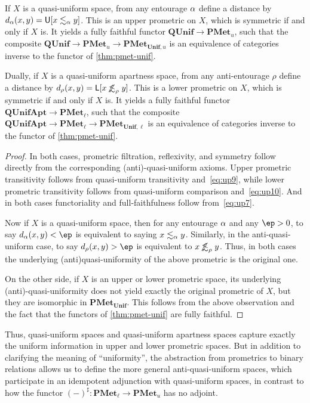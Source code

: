 \documentclass{article}
\def\upp#1{{#1}^{\sharp}}
\def\U[#1]{\mathsf{U}[#1]}
\def\L[#1]{\mathsf{L}[#1]}
\def\oapt{\mathrel{\!\not\,\not\lesssim}}
\def\leapx{\lesssim}
\def\ent#1{\leapx_{#1}}
\def\aent#1{\oapt_{#1}}
\def\PMetUnif{\mathbf{PMet}_{\mathbf{Unif}}}
\def\PMetu{\mathbf{PMet}_u}
\def\PMetl{\mathbf{PMet}_\ell}
\def\PMetUnifu{\mathbf{PMet}_{\mathbf{Unif},u}}
\def\PMetUnifl{\mathbf{PMet}_{\mathbf{Unif},\ell}}
\def\QUnif{\mathbf{QUnif}}
\def\QUnifApt{\mathbf{QUnifApt}}
\begin{document}
\begin{thm}
  If $X$ is a quasi-uniform space, from any entourage $\alpha$ define a distance by $d_\al(x,y) = \U[x\ent\al y]$.
  This is an upper prometric on $X$, which is symmetric if and only if $X$ is.
  It yields a fully faithful functor $\QUnif \to \PMetu$, such that the composite $\QUnif \to \PMetu \to \PMetUnifu$ is an equivalence of categories inverse to the functor of \cref{thm:pmet-unif}.

  Dually, if $X$ is a quasi-uniform apartness space, from any anti-entourage $\rho$ define a distance by $d_\rho(x,y) = \L[x\aent\rho y]$.
  This is a lower prometric on $X$, which is symmetric if and only if $X$ is.
  It yields a fully faithful functor $\QUnifApt \to \PMetl$, such that the composite $\QUnifApt \to \PMetl \to \PMetUnifl$ is an equivalence of categories inverse to the functor of \cref{thm:pmet-unif}.
\end{thm}
\begin{proof}
  In both cases, prometric filtration, reflexivity, and symmetry follow directly from the corresponding (anti)-quasi-uniform axioms.
  Upper prometric transitivity follows from quasi-uniform transitivity and~\eqref{eq:up9}, while lower prometric transitivity follows from quasi-uniform comparison and~\eqref{eq:up10}.
  And in both cases functoriality and full-faithfulness follow from~\eqref{eq:up7}.

  Now if $X$ is a quasi-uniform space, then for any entourage $\alpha$ and any $\ep>0$, to say $d_\al(x,y)<\ep$ is equivalent to saying $x\ent\al y$.
  Similarly, in the anti-quasi-uniform case, to say $d_\rho(x,y)>\ep$ is equivalent to $x\aent\rho y$.
  Thus, in both cases the underlying (anti)quasi-uniformity of the above prometric is the original one.

  On the other side, if $X$ is an upper or lower prometric space, its underlying (anti)-quasi-uniformity does not yield exactly the original prometric of $X$, but they are isomorphic in $\PMetUnif$.
  This follows from the above observation and the fact that the functors of \cref{thm:pmet-unif} are fully faithful.
\end{proof}

Thus, quasi-uniform spaces and quasi-uniform apartness spaces capture exactly the uniform information in upper and lower prometric spaces.
But in addition to clarifying the meaning of ``uniformity'', the abstraction from prometrics to binary relations allows us to define the more general anti-quasi-uniform spaces, which participate in an idempotent adjunction with quasi-uniform spaces, in contrast to how the functor $\upp{(-)} : \PMetl \to \PMetu$ has no adjoint.
\end{document}

